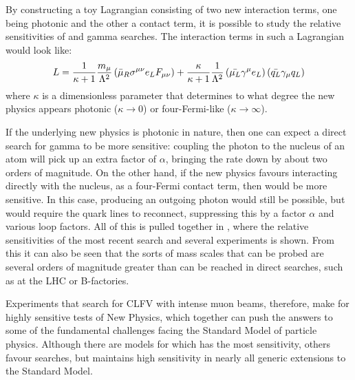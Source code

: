 By constructing a toy Lagrangian consisting of two new interaction terms, one being photonic and the other a contact term, it is possible to study the relative sensitivities of \mueconv and \mutoe gamma searches.
The interaction terms in such a Lagrangian would look like:
\begin{equation}
L=\frac{1}{\kappa+1}\frac{m_\mu}{\Lambda^2}\left(\bar{\mu}_R\sigma^{\mu\nu}e_LF_{\mu\nu}\right)+\frac{\kappa}{\kappa+1}\frac{1}{\Lambda^2}\left(\bar{\mu_L}\gamma^\mu e_L\right)\left(\bar{q_L}\gamma_\mu q_L\right)
\eqlabel{theory:toy}
\end{equation}
where $\kappa$ is a dimensionless parameter that determines to what degree the new physics appears photonic ($\kappa\rightarrow0$) or four-Fermi-like ($\kappa\rightarrow\infty$).
\FigTheoryMuecVsMueg

If the underlying new physics is photonic in nature, then one can expect a direct search for \mutoe gamma to be more sensitive: coupling the photon to the nucleus of an atom will pick up an extra factor of $\alpha$, bringing the rate down by about two orders of magnitude.
On the other hand, if the new physics favours interacting directly with the nucleus, as a four-Fermi contact term, then \mueconv would be more sensitive. 
In this case, producing an outgoing photon would still be possible, but would require the quark lines to reconnect, suppressing this by a factor $\alpha$ and various loop factors.
All of this is pulled together in , where the relative sensitivities of the most recent \muegamma search and several \mueconv experiments is shown.
From this it can also be seen that the sorts of mass scales that can be probed are several orders of magnitude greater than can be reached in direct searches, such as at the LHC or B-factories.

Experiments that search for \ac{CLFV} with intense muon beams, therefore, make for highly sensitive tests of New Physics, which together can push the answers to some of the fundamental challenges facing the Standard Model of particle physics.
Although there are models for which \mueconv has the most sensitivity, others favour \muegamma searches, but \mueconv maintains high sensitivity in nearly all generic extensions to the Standard Model.

